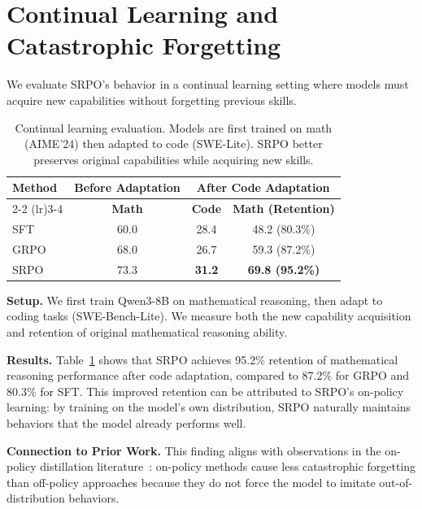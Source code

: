 \documentclass{article}
\newcommand{\method}{SRPO}
\theoremstyle{plain}
\theoremstyle{definition}
\theoremstyle{remark}
\begin{document}
\newpage
\section{Continual Learning and Catastrophic Forgetting}
\label{appendix:continual}

We evaluate \method{}'s behavior in a continual learning setting where models must acquire new capabilities without forgetting previous skills.

\begin{table}[h]
\centering
\caption{Continual learning evaluation. Models are first trained on math (AIME'24) then adapted to code (SWE-Lite). \method{} better preserves original capabilities while acquiring new skills.}
\label{tab:continual}
\vspace{0.5em}
\begin{tabular}{@{}lccc@{}}
\toprule
\textbf{Method} & \textbf{Before Adaptation} & \multicolumn{2}{c}{\textbf{After Code Adaptation}} \\
\cmidrule(lr){2-2} \cmidrule(lr){3-4}
 & \textbf{Math} & \textbf{Code} & \textbf{Math (Retention)} \\
\midrule
SFT & 60.0 & 28.4 & 48.2 (80.3\%) \\
GRPO & 68.0 & 26.7 & 59.3 (87.2\%) \\
\method{} & 73.3 & \textbf{31.2} & \textbf{69.8 (95.2\%)} \\
\bottomrule
\end{tabular}
\end{table}

\textbf{Setup.}
We first train Qwen3-8B on mathematical reasoning, then adapt to coding tasks (SWE-Bench-Lite).
We measure both the new capability acquisition and retention of original mathematical reasoning ability.

\textbf{Results.}
Table~\ref{tab:continual} shows that \method{} achieves 95.2\% retention of mathematical reasoning performance after code adaptation, compared to 87.2\% for GRPO and 80.3\% for SFT.
This improved retention can be attributed to \method{}'s on-policy learning: by training on the model's own distribution, \method{} naturally maintains behaviors that the model already performs well.

\textbf{Connection to Prior Work.}
This finding aligns with observations in the on-policy distillation literature~\cite{lu2025onpolicydistillation}: on-policy methods cause less catastrophic forgetting than off-policy approaches because they do not force the model to imitate out-of-distribution behaviors.
\end{document}
